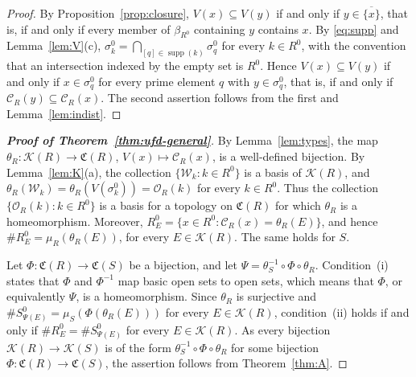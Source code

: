 \documentclass[12pt,reqno,a4paper]{amsart}
\newcommand{\K}{\mathcal{K}}
\newcommand{\W}{\mathcal{W}}
\newcommand{\clo}[1]{\overline{\{#1\}}}
\DeclareMathOperator{\supp}{supp}
\theoremstyle{plain}
\theoremstyle{definition}
\begin{document}
\begin{proof}
By Proposition~\ref{prop:closure}, $V(x)\subseteq V(y)$ if and only if $y\in\clo{x}$, that is, if and only if every member of $\beta_{R^0}$ containing $y$ contains $x$. By \eqref{eq:supp} and Lemma~\ref{lem:V}(c), $\sigma_k^0=\bigcap\limits_{[q]\in\supp(k)}\sigma_q^0$ for every $k\in R^0$, with the convention that an intersection indexed by the empty set is $R^0$. Hence $V(x)\subseteq V(y)$ if and only if $x\in\sigma_q^0$ for every prime element $q$ with $y\in\sigma_q^0$, that is, if and only if $\mathcal{C}_R(y)\subseteq\mathcal{C}_R(x)$. The second assertion follows from the first and Lemma~\ref{lem:indist}.
\end{proof}
\begin{proof}[\normalfont\bfseries Proof of Theorem~\ref{thm:ufd-general}]
By Lemma~\ref{lem:types}, the map $\theta_R\colon\K(R)\to\mathfrak{C}(R)$, $V(x)\mapsto\mathcal{C}_R(x)$, is a well-defined bijection. By Lemma~\ref{lem:K}(a), the collection $\{\W_k:k\in R^0\}$ is a basis of $\K(R)$, and $\theta_R(\W_k)=\theta_R(V(\sigma_k^0))=\mathcal{O}_R(k)$ for every $k\in R^0$. Thus the collection $\{\mathcal{O}_R(k):k\in R^0\}$ is a basis for a topology on $\mathfrak{C}(R)$ for which $\theta_R$ is a homeomorphism. Moreover, $R^0_E=\{x\in R^0:\mathcal{C}_R(x)=\theta_R(E)\}$, and hence $\#R^0_E=\mu_R(\theta_R(E))$, for every $E\in\K(R)$. The same holds for $S$.

Let $\Phi\colon\mathfrak{C}(R)\to\mathfrak{C}(S)$ be a bijection, and let $\Psi=\theta_S^{-1}\circ\Phi\circ\theta_R$. Condition~(i) states that $\Phi$ and $\Phi^{-1}$ map basic open sets to open sets, which means that $\Phi$, or equivalently $\Psi$, is a homeomorphism. Since $\theta_R$ is surjective and $\#S^0_{\Psi(E)}=\mu_S(\Phi(\theta_R(E)))$ for every $E\in\K(R)$, condition~(ii) holds if and only if $\#R^0_E=\#S^0_{\Psi(E)}$ for every $E\in\K(R)$. As every bijection $\K(R)\to\K(S)$ is of the form $\theta_S^{-1}\circ\Phi\circ\theta_R$ for some bijection $\Phi\colon\mathfrak{C}(R)\to\mathfrak{C}(S)$, the assertion follows from Theorem~\ref{thm:A}.
\end{proof}
\end{document}
